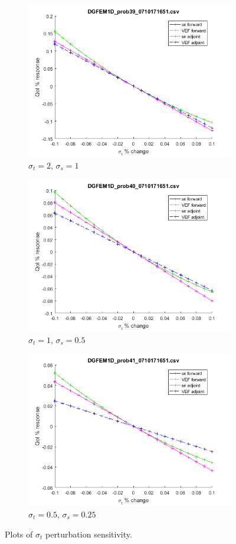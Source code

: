 \documentclass{article}
\newcommand{\sigt}{\sigma_t}
\newcommand{\sigs}{\sigma_s}
\begin{document}
\begin{figure}[H]
\label{InHomoPertt}
\centering
\begin{subfigure}{.5\textwidth}
  \centering
  \includegraphics[width=.8\linewidth]{figures/39sigtSens.png}
  \caption{$\sigt=2$, $\sigs=1$}
  \label{fig:sfig1}
\end{subfigure}%
\begin{subfigure}{.5\textwidth}
  \centering
  \includegraphics[width=.8\linewidth]{figures/40sigtSens.png}
  \caption{$\sigt=1$, $\sigs=0.5$}
  \label{fig:sfig2}
\end{subfigure}
\begin{subfigure}{.5\textwidth}
  \centering
  \includegraphics[width=.8\linewidth]{figures/41sigtSens.png}
  \caption{$\sigt=0.5$, $\sigs=0.25$}
  \label{fig:sfig3}
\end{subfigure}
\caption{Plots of $\sigt$ perturbation sensitivity.}
\label{fig:fig}
\end{figure}
\end{document}
